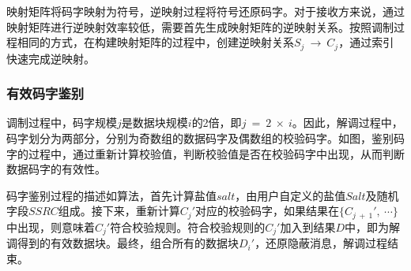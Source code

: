 映射矩阵将码字映射为符号，逆映射过程将符号还原码字。对于接收方来说，通过映射矩阵进行逆映射效率较低，需要首先生成映射矩阵的逆映射关系。按照调制过程相同的方式，在构建映射矩阵的过程中，创建逆映射关系$S_{j}\ \rightarrow\ C_{j}$，通过索引快速完成逆映射。

\subsubsection{有效码字鉴别}
\label{chap:zigzag:model:demodulation:identification}


调制过程中，码字规模$j$是数据块规模$i$的2倍，即$j\ =\ 2\ \times\ i$。因此，解调过程中，码字划分为两部分，分别为奇数组的数据码字及偶数组的校验码字。如图，鉴别码字的过程中，通过重新计算校验值，判断校验值是否在校验码字中出现，从而判断数据码字的有效性。

码字鉴别过程的描述如算法，首先计算盐值$salt$，由用户自定义的盐值$Salt$及随机字段$SSRC$组成。接下来，重新计算$C_{j}'$对应的校验码字，如果结果在$\{C_{j\ +\ 1}',\ \cdots\}$中出现，则意味着$C_{j}'$符合校验规则。符合校验规则的$C_{j}'$加入到结果$D$中，即为解调得到的有效数据块。最终，组合所有的数据块$D_{i}'$，还原隐蔽消息，解调过程结束。